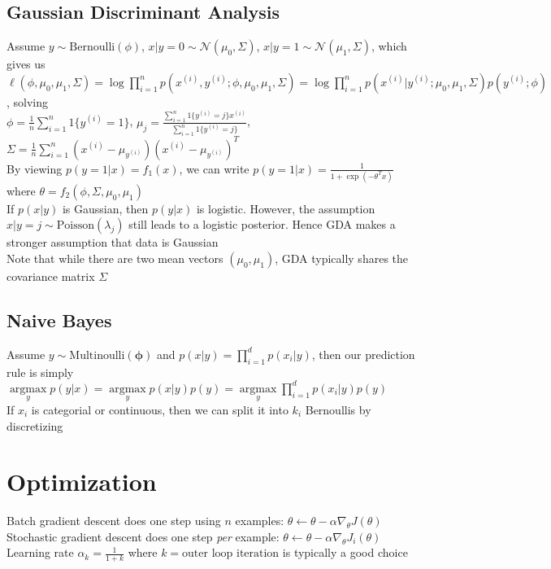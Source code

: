 \documentclass{article}
\DeclareMathOperator*{\argmax}{argmax}
\begin{document}
\subsection{Gaussian Discriminant Analysis}
Assume $y \sim \mbox{Bernoulli}(\phi)$, $x|y=0 \sim \mathcal{N}(\mu_0, \Sigma)$, $x|y=1 \sim \mathcal{N}(\mu_1, \Sigma)$, which gives us \\
$\ell(\phi, \mu_0, \mu_1, \Sigma) = \log \prod\limits_{i=1}^np(x^{(i)}, y^{(i)}; \phi, \mu_0, \mu_1, \Sigma) = \log \prod\limits_{i=1}^np(x^{(i)} | y^{(i)}; \mu_0, \mu_1, \Sigma)p(y^{(i)}; \phi)$, solving \\
$\phi = \frac{1}{n}\sum\limits_{i=1}^n 1\{y^{(i)} = 1\}$, $\mu_j = \frac{\sum_{i=1}^n 1\{y^{(i)} = j\} x^{(i)}} {\sum_{i=1}^n 1\{y^{(i)} = j\}}$, $\Sigma = \frac{1}{n}\sum\limits_{i=1}^n (x^{(i)} - \mu_{y^{(i)}})(x^{(i)} - \mu_{y^{(i)}})^T$ \\
By viewing $p(y=1|x) = f_1(x)$, we can write $p(y=1|x) = \frac{1}{1+\exp(-\theta^Tx)}$ where $\theta = f_2(\phi, \Sigma, \mu_0, \mu_1)$ \\
If $p(x|y)$ is Gaussian, then $p(y|x)$ is logistic. However, the assumption  $x|y = j \sim \mbox{Poisson}(\lambda_j)$ still leads to a logistic posterior. Hence GDA makes a stronger assumption that data is Gaussian \\
Note that while there are two mean vectors $(\mu_0, \mu_1)$, GDA typically shares the covariance matrix $\Sigma$

\subsection{Naive Bayes}
Assume $y \sim \mbox{Multinoulli}(\boldsymbol \phi)$ and $p(x|y) = \prod\limits_{i=1}^d p(x_i | y)$, then our prediction rule is simply \\
$\argmax\limits_y p(y | x) = \argmax\limits_y p(x|y)p(y) = \argmax\limits_y \prod\limits_{i=1}^d p(x_i | y) p(y)$ \\
If $x_i$ is categorial or continuous, then we can split it into $k_i$ Bernoullis by discretizing

\section{Optimization}
Batch gradient descent does one step using $n$ examples: $ \theta \leftarrow \theta - \alpha \nabla_\theta J(\theta)$ \\
Stochastic gradient descent does one step \textit{per} example: $\theta \leftarrow \theta - \alpha \nabla_\theta J_i(\theta)$ \\
Learning rate $\alpha_k = \frac{1}{1+k}$ where $k = \mbox{outer loop iteration}$ is typically a good choice
\end{document}
